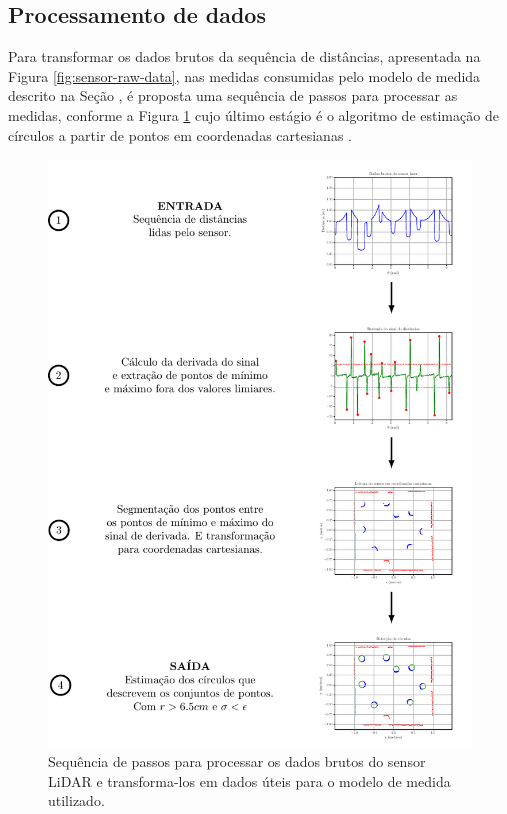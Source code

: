 \subsection{Processamento de dados}
Para transformar os dados brutos da sequência de distâncias, apresentada na Figura 
\ref{fig:sensor-raw-data}, nas medidas consumidas pelo modelo de medida 
descrito na Seção \emph{}, é proposta uma sequência de passos para processar as medidas, conforme a Figura \ref{fig:lidar-data-processing-pipeline} cujo último estágio é o 
algoritmo de estimação de círculos a partir de pontos em coordenadas 
cartesianas \cite[p.~903]{al2009error}.

\begin{figure}[]
  \includegraphics[width=\textwidth]{figs/data_processing_pipeline.pdf}
  \caption{Sequência de passos para processar os dados brutos do sensor LiDAR e
  transforma-los em dados úteis para o modelo de medida utilizado.}
  \label{fig:lidar-data-processing-pipeline}
\end{figure}

